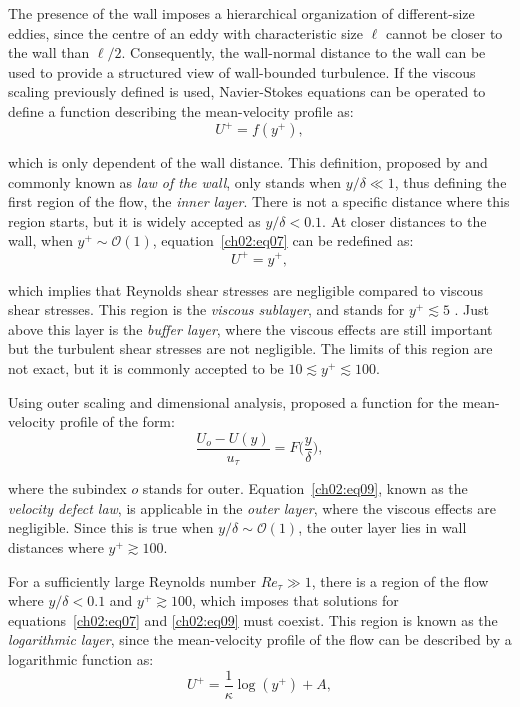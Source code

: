 The presence of the wall imposes a hierarchical organization of different-size eddies, since the centre of an eddy with characteristic size $\ell$ cannot be closer to the wall than $\ell/2$.
Consequently, the wall-normal distance to the wall can be used to provide a structured view of wall-bounded turbulence.
If the viscous scaling previously defined is used, Navier-Stokes equations can be operated to define a function describing the mean-velocity profile as:
\begin{equation}
  U^+=f(y^+),
  \label{ch02:eq07}
\end{equation}

\noindent which is only dependent of the wall distance.
This definition, proposed by \citet{prandtl1925bericht} and commonly known as \textit{law of the wall}, only stands when $y/\delta\ll1$, thus defining the first region of the flow, the \textit{inner layer}.
There is not a specific distance where this region starts, but it is widely accepted as $y/\delta<0.1$.
At closer distances to the wall, when $y^+\sim\mathcal{O}(1)$, equation~\ref{ch02:eq07} can be redefined as:
\begin{equation}
  U^+=y^+,
  \label{ch02:eq08}
\end{equation}

\noindent which implies that Reynolds shear stresses are negligible compared to viscous shear stresses.
This region is the \textit{viscous sublayer}, and stands for $y^+\lesssim5$ \citep{reichardt1951vollstandige}.
Just above this layer is the \textit{buffer layer}, where the viscous effects are still important but the turbulent shear stresses are not negligible.
The limits of this region are not exact, but it is commonly accepted to be $10\lesssim y^+\lesssim 100$.

Using outer scaling and dimensional analysis, \citet{von1930mechanische} proposed a function for the mean-velocity profile of the form:
\begin{equation}
  \frac{U_o - U(y)}{u_{\tau}} = F\biggl(\frac{y}{\delta}\biggl),
  \label{ch02:eq09}
\end{equation}

\noindent where the subindex $o$ stands for outer.
Equation~\ref{ch02:eq09}, known as the \textit{velocity defect law}, is applicable in the \textit{outer layer}, where the viscous effects are negligible.
Since this is true when $y/\delta\sim\mathcal{O}(1)$, the outer layer lies in wall distances where $y^+\gtrsim100$.

For a sufficiently large Reynolds number $Re_{\tau}\gg1$, there is a region of the flow where $y/\delta<0.1$ and $y^+\gtrsim100$, which imposes that solutions for equations~\ref{ch02:eq07} and \ref{ch02:eq09} must coexist.
This region is known as the \textit{logarithmic layer}, since the mean-velocity profile of the flow can be described by a logarithmic function as:
\begin{equation}
  U^+ = \frac{1}{\kappa}\log(y^+)+A,
  \label{ch02:eq10}
\end{equation}

